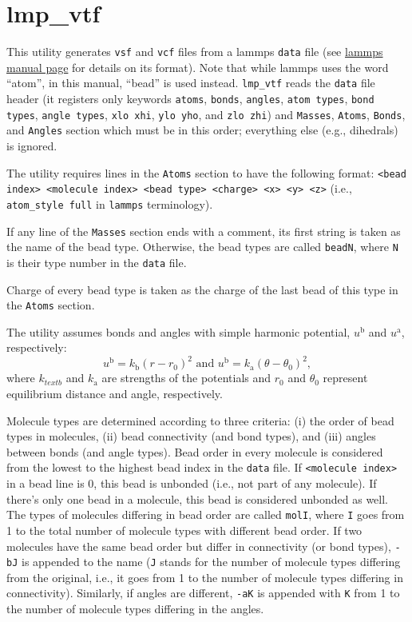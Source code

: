 \section{lmp\_vtf} \label{sec:lmp_vtf}

This utility generates \texttt{vsf} and \texttt{vcf} files from a lammps
\texttt{data} file (see
\href{https://lammps.sandia.gov/doc/read_data.html}{lammps manual page} for
details on its format). Note that while lammps uses the word
\enquote{atom}, in this manual, \enquote{bead} is used instead.
\texttt{lmp\_vtf} reads the \texttt{data} file header (it registers only
keywords \texttt{atoms}, \texttt{bonds}, \texttt{angles}, \texttt{atom
types}, \texttt{bond types}, \texttt{angle types}, \texttt{xlo xhi},
\texttt{ylo yho}, and \texttt{zlo zhi}) and \texttt{Masses},
\texttt{Atoms}, \texttt{Bonds}, and \texttt{Angles} section which must be
in this order; everything else (e.g., dihedrals) is ignored.

The utility requires lines in the \texttt{Atoms} section to have the
following format: \texttt{<bead index> <molecule index> <bead type>
<charge> <x> <y> <z>} (i.e., \texttt{atom\_style full} in \texttt{lammps}
terminology).

If any line of the \texttt{Masses} section ends with a comment, its first
string is taken as the name of the bead type. Otherwise, the bead types are
called \texttt{beadN}, where \texttt{N} is their type number in the
\texttt{data} file.

Charge of every bead type is taken as the charge of the last bead of this
type in the \texttt{Atoms} section.

The utility assumes bonds and angles with simple harmonic potential,
$u^{\text{b}}$ and $u^{\text{a}}$, respectively:
\begin{equation}
  u^{\text{b}} = k_{\text{b}}\left(r-r_0\right)^2 \text{ and }
  u^{\text{b}} = k_{\text{a}}\left(\theta-\theta_0\right)^2,
\end{equation}
where $k_{text{b}}$ and $k_{\text{a}}$ are strengths of the potentials and
$r_0$ and $\theta_0$ represent equilibrium distance and angle,
respectively.

Molecule types are determined according to three criteria: (i) the order of
bead types in molecules, (ii) bead connectivity (and bond types), and (iii)
angles between bonds (and angle types). Bead order in every molecule is
considered from the lowest to the highest bead index in the \texttt{data}
file. If \texttt{<molecule index>} in a bead line is 0, this bead is
unbonded (i.e., not part of any molecule). If there's only one bead in a
molecule, this bead is considered unbonded as well. The types of molecules
differing in bead order are called \texttt{molI}, where \texttt{I} goes
from 1 to the total number of molecule types with different bead order. If
two molecules have the same bead order but differ in connectivity (or bond
types), \texttt{-bJ} is appended to the name (\texttt{J} stands for the
number of molecule types differing from the original, i.e., it goes from 1
to the number of molecule types differing in connectivity). Similarly, if
angles are different, \texttt{-aK} is appended with \texttt{K} from 1 to
the number of molecule types differing in the angles.

